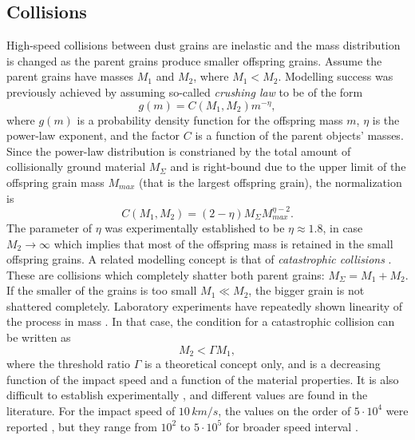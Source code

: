 \subsection{Collisions} \label{ch:collisions}

High-speed collisions between dust grains are inelastic and the mass distribution is changed as the parent grains produce smaller offspring grains. Assume the parent grains have masses $M_1$ and $M_2$, where $M_1 < M_2$. Modelling success was previously achieved \citep{gault1963spray,dohnanyi1969collisional} by assuming so-called \textit{crushing law} to be of the form
\begin{equation}
    g(m) = C(M_1,M_2)m^{-\eta},
    \label{eq:crushing_law}
\end{equation}
where $g(m)$ is a probability density function for the offspring mass $m$, $\eta$ is the power-law exponent, and the factor $C$ is a function of the parent objects' masses. Since the power-law distribution is constrianed by the total amount of collisionally ground material $M_\Sigma$ and is right-bound due to the upper limit of the offspring grain mass $M_{max}$ (that is the largest offspring grain), the normalization is
\begin{equation}
    C(M_1,M_2) = (2-\eta) M_\Sigma M_{max}^{\eta -2}.
\end{equation}
The parameter of $\eta$ was experimentally established \citep{gault1963spray} to be $\eta \approx 1.8$, in case $M_2 \rightarrow \infty$ which implies that most of the offspring mass is retained in the small offspring grains. 
A related modelling concept is that of \textit{catastrophic collisions} \citep{dohnanyi1969collisional,grun1985collisional}. These are collisions which completely shatter both parent grains: $M_\Sigma = M_1 + M_2$. If the smaller of the grains is too small $M_1 \ll M_2$, the bigger grain is not shattered completely. Laboratory experiments have repeatedly shown linearity of the process in mass \citep{gault1963spray,dietzel1973heos,grun1984impact,mcbride1999meteoroid,collette2014micrometeoroid,shen2021cosmic}. In that case, the condition for a catastrophic collision can be written as 
\begin{equation}
    M_2 < \Gamma M_1,
\end{equation}
where the threshold ratio $\Gamma$ is a theoretical concept only, and is a decreasing function of the impact speed and a function of the material properties. It is also difficult to establish experimentally \citep{grun1985collisional}, and different values are found in the literature. For the impact speed of $10 \, \si{km/s}$, the values on the order of $5 \cdot 10^{4}$ were reported \citep{gault1969destruction,fujiwara1977destruction}, but they range from $10^2$ to $5\cdot 10^5$ for broader speed interval \citep{whipple1967maintaining,zook1975source,dohnanyi1978particle}. 
